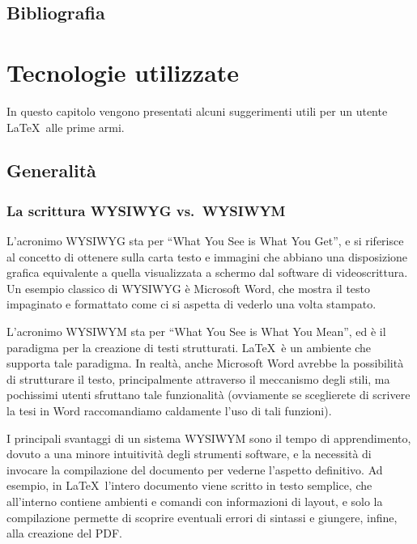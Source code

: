\documentclass[12pt]{report}
\begin{document}
\section{Bibliografia}
\printbibliography


%
%

\chapter{Tecnologie utilizzate}
\label{cap3}

In questo capitolo vengono presentati alcuni suggerimenti utili per un utente \LaTeX\ alle prime armi.


\section{Generalit\`a}

\subsection{La scrittura WYSIWYG vs.\ WYSIWYM}

L'acronimo WYSIWYG sta per ``What You See is What You Get'', e si riferisce al concetto di ottenere sulla carta testo e immagini che abbiano una disposizione grafica equivalente a quella visualizzata a schermo dal software di videoscrittura. Un esempio classico di WYSIWYG è Microsoft Word, che mostra il testo impaginato e formattato come ci si aspetta di vederlo una volta stampato.

L'acronimo WYSIWYM sta per ``What You See is What You Mean'', ed è il paradigma per la creazione di testi strutturati. \LaTeX\ è un ambiente che supporta tale paradigma. In realtà, anche Microsoft Word avrebbe la possibilità di strutturare il testo, principalmente attraverso il meccanismo degli stili, ma pochissimi utenti sfruttano tale funzionalità (ovviamente se sceglierete di scrivere la tesi in Word raccomandiamo caldamente l'uso di tali funzioni).

I principali svantaggi di un sistema WYSIWYM sono il tempo di apprendimento, dovuto a una minore intuitività degli strumenti software, e la necessità di invocare la compilazione del documento per vederne l'aspetto definitivo. Ad esempio, in \LaTeX\ l'intero documento viene scritto in testo semplice, che all'interno contiene ambienti e comandi con informazioni di layout, e solo la compilazione permette di scoprire eventuali errori di sintassi e giungere, infine, alla creazione del PDF.
\end{document}
